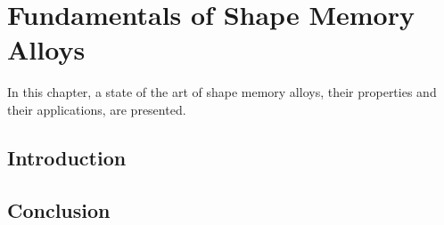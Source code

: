 
\chapter{Fundamentals of Shape Memory Alloys}
In this chapter, a state of the art of shape memory alloys, their properties and their applications, are presented.
\section{Introduction}
\section{Conclusion}
